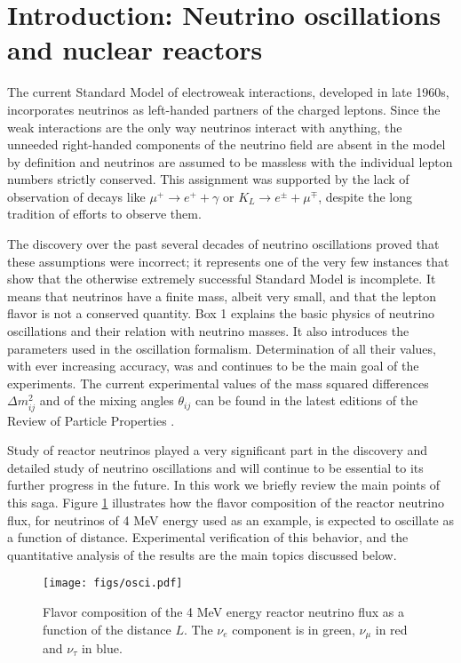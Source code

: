 \section{Introduction: Neutrino oscillations and nuclear reactors} 
\label{sec:intro}

The current Standard Model of electroweak interactions,
developed in late 1960s, incorporates neutrinos as left-handed partners of the charged leptons. Since the weak interactions are the
only way neutrinos interact with anything, the unneeded right-handed components of the neutrino field are absent in the model
by definition and neutrinos are assumed to be massless with the individual lepton numbers strictly conserved.
This assignment was supported by the lack of observation of decays like 
$\mu^+ \rightarrow e^+ + \gamma$ or $K_L \rightarrow e^{\pm} + \mu^{\mp}$,
despite the long tradition of efforts to observe them.

The discovery over the past several decades
of neutrino oscillations proved that these assumptions were incorrect; it
represents one of the very few instances that show that the otherwise
extremely successful Standard Model is incomplete. It means that
neutrinos have a finite mass, albeit very small, and that the lepton flavor is not a conserved quantity.
Box 1 explains the basic physics of neutrino oscillations and their relation with neutrino masses. It
also introduces the parameters used in the oscillation formalism. Determination of all their values,
with ever increasing accuracy,
was and continues to be the main goal of the experiments.
The current experimental values of the mass squared differences $\Delta m^2_{ij}$ and of the mixing angles $\theta_{ij}$ can be found
in the latest editions of the Review of Particle Properties \cite{PDG14}.

Study of reactor neutrinos played a very significant part in the discovery and detailed study of neutrino oscillations and will continue 
to be essential to its further progress in the future. In this work we briefly review
the main points of this saga. Figure \ref{fig:intro1} illustrates how the flavor composition of the reactor neutrino flux, for neutrinos of 4 MeV energy
used as an example, is expected to oscillate as a function of distance. Experimental verification of this behavior, and the quantitative analysis of the
results are the main topics discussed below.

\begin{figure}[htb]
\begin{centering}
\texttt{[image: figs/osci.pdf]}
\par\end{centering}
\caption{\label{fig:intro1} Flavor composition of the 4 MeV energy reactor neutrino flux as a function of the distance  $L$. The $\nu_e$ component 
is in green, $\nu_{\mu}$ in  red and $\nu_{\tau}$  in blue. }
\end{figure}


